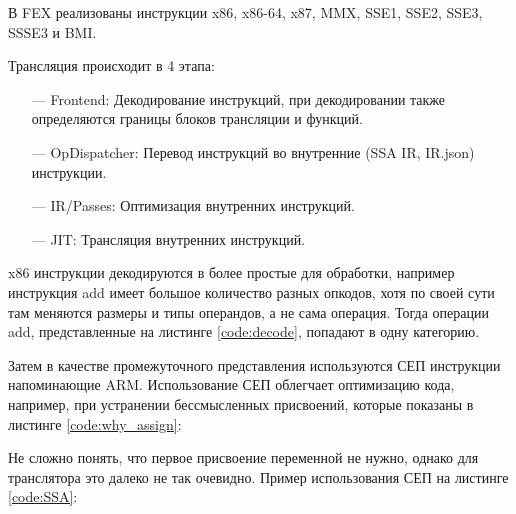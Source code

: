 В FEX реализованы инструкции x86, x86-64, x87, MMX, SSE1, SSE2, SSE3, SSSE3 и BMI. 

Трансляция происходит в 4 этапа:

\begin{itemize}[leftmargin=1.6\parindent]
	\item[---] Frontend: Декодирование инструкций, при декодировании также определяются границы блоков трансляции и функций.
	\item[---] OpDispatcher: Перевод инструкций во внутренние (SSA IR, IR.json) инструкции.
	\item[---] IR/Passes: Оптимизация внутренних инструкций.
	\item[---] JIT: Трансляция внутренних инструкций.
\end{itemize}

x86 инструкции декодируются в более простые для обработки, например инструкция add имеет большое количество разных опкодов, хотя по своей сути там меняются размеры и типы операндов, а не сама операция. Тогда операции add, представленные на листинге \ref{code:decode}, попадают в одну категорию.


Затем в качестве промежуточного представления используются СЕП инструкции напоминающие ARM. Использование СЕП облегчает оптимизацию кода, например, при устранении бессмысленных присвоений, которые показаны в листинге \ref{code:why_assign}:

Не сложно понять, что первое присвоение переменной не нужно, однако для транслятора это далеко не так очевидно. Пример использования СЕП на листинге \ref{code:SSA}:

